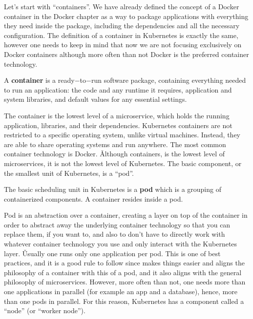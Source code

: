 Let's start with ``containers''. We have already defined the concept of a Docker container in the Docker chapter as a
way to package applications with everything they need inside the package, including the dependencies and all the
necessary configuration. The definition of a container in Kubernetes is exactly the same, however one needs to keep
in mind that now we are not focusing exclusively on Docker containers although more often than not Docker is the
preferred container technology.

\bd[Container]
A \textbf{container} is a ready$-$to$-$run software package, containing everything needed to run an application: the
code and any runtime it requires, application and system libraries, and default values for any essential settings.
\ed


The container is the lowest level of a microservice, which holds the running application, libraries, and their
dependencies. Kubernetes containers are not restricted to a specific operating system, unlike virtual machines.
Instead, they are able to share operating systems and run anywhere. The most common container technology is Docker. \v

Although containers, is the lowest level of microservices, it is not the lowest level of Kubernetes. The basic
component, or the smallest unit of Kubernetes, is a ``pod''.

\bd[Pod]
The basic scheduling unit in Kubernetes is a \textbf{pod} which is a grouping of containerized components. A container
resides inside a pod.
\ed


Pod is an abstraction over a container, creating a layer on top of the container in order to abstract away the
underlying container technology so that you can replace them, if you want to, and also to don't have to directly work
with whatever container technology you use and only interact with the Kubernetes layer. \v

Usually one runs only one application per pod. This is one of best practices, and it is a good rule to follow since
makes things easier and aligns the philosophy of a container with this of a pod, and it also aligns with the general
philosophy of microservices. However, more often than not, one needs more than one applications in parallel (for
example an app and a database), hence, more than one pods in parallel. For this reason, Kubernetes has a component
called a ``node'' (or ``worker node'').


